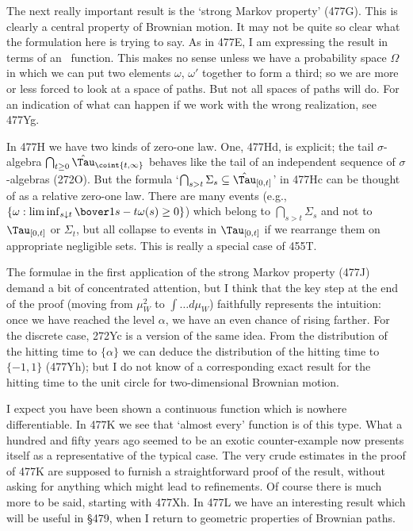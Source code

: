 {The next really important result is the `strong Markov property' (477G).
This is clearly a central property of Brownian motion.   It may not
be quite so clear what the formulation here is trying to say.   As in 477E,
I am expressing the result in terms of an \imp\ function.   This makes no
sense unless we have a probability space $\Omega$ in which we can put two
elements $\omega$, $\omega'$ together to form a third;  so we are more or
less forced to look at a space of paths.   But not all spaces of paths will
do.   For an indication of what can happen if we work with
the wrong realization, see 477Yg.

In 477H we have two kinds of zero-one law.   One, 477Hd, is explicit; the
tail $\sigma$-algebra $\bigcap_{t\ge 0}\hat\Tau_{\coint{t,\infty}}$ behaves
like the tail of an independent sequence of  $\sigma$-algebras (272O).
But the formula `$\bigcap_{s>t}\Sigma_s\subseteq\hat\Tau_{[0,t]}$' in
477Hc can
be thought of as a relative zero-one law.   There are many events (e.g.,
$\{\omega:\liminf_{s\downarrow t}\bover1{s-t}\omega(s)\ge 0\}$)
which belong to $\bigcap_{s>t}\Sigma_s$ and not to $\Tau_{[0,t]}$ or
$\Sigma_t$, but all collapse to events in $\Tau_{[0,t]}$
if we rearrange them on appropriate negligible sets.   This is really a
special case of 455T.

The formulae in the first application of the strong Markov property (477J)
demand a bit of concentrated attention, but
I think that the key step at the end of the proof (moving from $\mu_W^2$ to
$\int\ldots d\mu_W$) faithfully represents the intuition:  once we have
reached the level $\alpha$, we have an even chance of rising farther.
For the discrete case, 272Yc is a version of the same idea.
From the distribution of the
hitting time to $\{\alpha\}$ we can deduce the distribution of the
hitting time to $\{-1,1\}$ (477Yh);   but I do not know of a corresponding
exact result for the hitting time to the unit circle for two-dimensional
Brownian motion.

I expect you have been shown a continuous
function which is nowhere differentiable.   In 477K we see that
`almost every'
function is of this type.   What a hundred and fifty years ago seemed to be
an exotic counter-example now presents itself as a representative of the
typical case.
The very crude estimates in the proof of 477K are supposed to furnish a
straightforward proof of the result, without asking for anything which
might lead to refinements.   Of course there is much more to be said,
starting with 477Xh.   In 477L we have an interesting result which will
be useful in \S479, when
I return to geometric properties of Brownian paths.


}%

\discrpage

